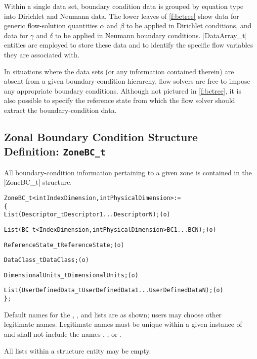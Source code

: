 Within a single data set, boundary condition data is grouped by
equation type into Dirichlet and Neumann data.  The lower leaves of
\autoref{f:bctree} show data for generic flow-solution quantities
$\alpha$ and $\beta$ to be applied in Dirichlet conditions, and data
for $\gamma$ and $\delta$ to be applied in Neumann boundary conditions.
|DataArray_t| entities are employed to store these data and to identify
the specific flow variables they are associated with.

In situations where the data sets (or any information contained therein)
are absent from a given boundary-condition hierarchy, flow solvers
are free to impose any appropriate boundary conditions.  Although
not pictured in \autoref{f:bctree}, it is also possible to specify
the reference state from which the flow solver should extract the
boundary-condition data.

\subsection{Zonal Boundary Condition Structure Definition: \texttt{ZoneBC\_t}}
\label{s:ZoneBC}

All boundary-condition information pertaining to a given
zone is contained in the |ZoneBC_t| structure.
\begin{alltt}
  ZoneBC\_t< int IndexDimension, int PhysicalDimension > :=
    \{
    List( Descriptor\_t Descriptor1 ... DescriptorN ) ;                      (o)

    List( BC\_t<IndexDimension, int PhysicalDimension> BC1 ... BCN ) ;       (o)

    ReferenceState\_t ReferenceState ;                                       (o)

    DataClass\_t DataClass ;                                                 (o)
                
    DimensionalUnits\_t DimensionalUnits ;                                   (o)

    List( UserDefinedData\_t UserDefinedData1 ... UserDefinedDataN ) ;       (o)
    \} ;
\end{alltt}

\begin{notes}
\item
 Default names for the , , and
 lists are as shown; users may choose other legitimate names.
 Legitimate names must be unique within a given instance of
  and shall not include the names ,
 , or .
\item
 All lists within a  structure entity may be empty.
\end{notes}

